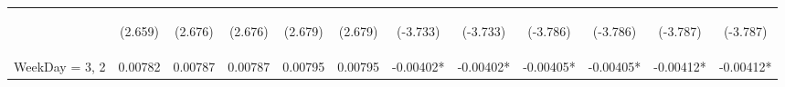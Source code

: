 \documentclass[]{article}
\begin{document}
\begin{center}
\begin{tabular}{lccccccccccc}
        \vspace{4pt}     & \begin{footnotesize}(2.659)\end{footnotesize}  & \begin{footnotesize}(2.676)\end{footnotesize}  & \begin{footnotesize}(2.676)\end{footnotesize}  & \begin{footnotesize}(2.679)\end{footnotesize}  & \begin{footnotesize}(2.679)\end{footnotesize}  & \begin{footnotesize}(-3.733)\end{footnotesize}  & \begin{footnotesize}(-3.733)\end{footnotesize}  & \begin{footnotesize}(-3.786)\end{footnotesize} & \begin{footnotesize}(-3.786)\end{footnotesize} & \begin{footnotesize}(-3.787)\end{footnotesize} & \begin{footnotesize}(-3.787)\end{footnotesize} \\
        WeekDay = 3, 2   & 0.00782                                        & 0.00787                                        & 0.00787                                        & 0.00795                                        & 0.00795                                        & -0.00402*                                       & -0.00402*                                       & -0.00405*                                      & -0.00405*                                      & -0.00412*                                      & -0.00412*                                      \\

\end{tabular}
\end{center}
\end{document}
